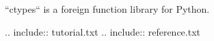``ctypes`` is a foreign function library for Python.

.. include:: tutorial.txt
.. include:: reference.txt

